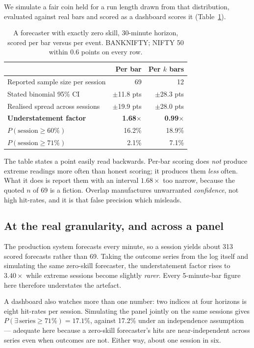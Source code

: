 \documentclass[conference]{IEEEtran}
\begin{document}
We simulate a fair coin held for a run length drawn from that distribution,
evaluated against real bars and scored as a dashboard scores it
(Table~\ref{tab:zero}).

\begin{table}[t]
\caption{A forecaster with exactly zero skill, 30-minute horizon, scored per bar
versus per event. BANKNIFTY; NIFTY 50 within 0.6 points on every row.}
\label{tab:zero}
\small
\footnotesize
\begin{tabular}{@{}lrr@{}}
\toprule
 & \textbf{Per bar} & \textbf{Per $k$ bars} \\
\midrule
Reported sample size per session & 69 & 12 \\
Stated binomial 95\% CI & $\pm$11.8 pts & $\pm$28.3 pts \\
Realised spread across sessions & $\pm$19.9 pts & $\pm$28.0 pts \\
\textbf{Understatement factor} & \textbf{1.68$\times$} & \textbf{0.99$\times$} \\
\midrule
$P(\text{session} \geq 60\%)$ & 16.2\% & 18.9\% \\
$P(\text{session} \geq 71\%)$ & 2.1\% & 7.1\% \\
\bottomrule
\end{tabular}
\end{table}

The table
states a point easily read backwards. Per-bar scoring does \emph{not}
produce extreme readings more often than honest scoring; it produces them
\emph{less} often. What it does is report them with an interval $1.68\times$ too
narrow, because the quoted $n$ of 69 is a fiction. Overlap manufactures
unwarranted \emph{confidence}, not high hit-rates, and it is that false
precision which misleads.

\subsection{At the real granularity, and across a panel}

The production system forecasts every minute, so a session yields about 313
scored forecasts rather than 69. Taking the outcome series from the log itself
and simulating the same zero-skill forecaster, the understatement factor rises
to $3.40\times$ while extreme sessions become slightly \emph{rarer}. Every
5-minute-bar figure here therefore understates the artefact.

A dashboard also watches more than one number: two indices at four horizons is
eight hit-rates per session. Simulating the panel jointly on the same sessions
gives $P(\exists\,\text{series}\geq 71\%) = 17.1\%$, against 17.2\% under an
independence assumption --- adequate here because a zero-skill forecaster's hits
are near-independent across series even when outcomes are not. Either way, about
one session in six.
\end{document}
